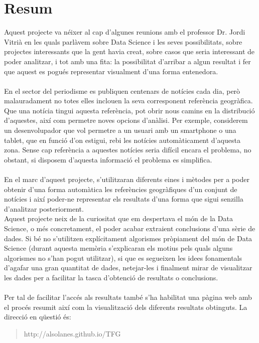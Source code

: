 \documentclass[12pt,a4paper,openright,oneside]{article}
\numberwithin{equation}{section}
\theoremstyle{definition}
\begin{document}
\section*{Resum}
Aquest projecte va néixer al cap d'algunes reunions amb el professor Dr. Jordi Vitrià en les quals parlàvem sobre Data Science i les seves possibilitats, sobre projectes interessants que la gent havia creat, sobre casos que seria interessant de poder analitzar, i tot amb una fita: la possibilitat d'arribar a algun resultat i fer que aquest es pogués representar visualment d'una forma entenedora. \\\\
En el sector del periodisme es publiquen centenars de notícies cada dia, però malauradament no totes elles inclouen la seva corresponent referència geogràfica. Que una notícia tingui aquesta referència, pot obrir nous camins en la distribució d'aquestes, així com permetre noves opcions d'anàlisi. Per exemple, considerem un desenvolupador que vol permetre a un usuari amb un smartphone o una tablet, que en funció d'on estigui, rebi les notícies automàticament d'aquesta zona. Sense cap referència a aquestes notícies seria difícil encara el problema, no obstant, si disposem d'aquesta informació el problema es simplifica.\\ \\
En el marc d'aquest projecte, s'utilitzaran diferents eines i mètodes per a poder obtenir d'una forma automàtica les referències geogràfiques d'un conjunt de notícies i així poder-ne representar els resultats d'una forma que sigui senzilla d'analitzar posteriorment.\\
Aquest projecte neix de la curiositat que em despertava el món de la Data Science, o més concretament, el poder acabar extraient conclusions d'una sèrie de dades. Si bé no s'utilitzen explícitament algorismes pròpiament del món de Data Science (durant aquesta memòria s'explicaran els motius pels quals alguns algorismes no s'han pogut utilitzar), si que es segueixen les idees fonamentals d'agafar una gran quantitat de dades, netejar-les i finalment mirar de visualitzar les dades per a facilitar la tasca d'obtenció de resultats o conclusions.\\ \\
Per tal de facilitar l'accés als resultats també s'ha habilitat una pàgina web amb el procés resumit així com la visualització dels diferents resultats obtinguts. La direcció en qüestió és:
\begin{quote}
\centering
http://alsolanes.github.io/TFG
\end{quote}
\end{document}
